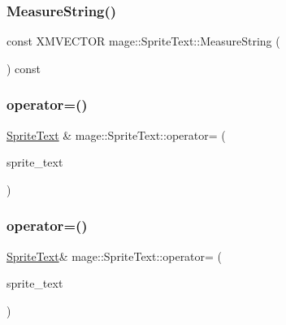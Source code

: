 \subsubsection{\texorpdfstring{Measure\+String()}{MeasureString()}}
{\footnotesize\ttfamily const X\+M\+V\+E\+C\+T\+OR mage\+::\+Sprite\+Text\+::\+Measure\+String (\begin{DoxyParamCaption}{ }\end{DoxyParamCaption}) const}

\hypertarget{classmage_1_1_sprite_text_acc41212e9847babd95afa68aedf2ad42}{}\label{classmage_1_1_sprite_text_acc41212e9847babd95afa68aedf2ad42} 
\subsubsection{\texorpdfstring{operator=()}{operator=()}\hspace{0.1cm}{\footnotesize\ttfamily [1/2]}}
{\footnotesize\ttfamily \hyperlink{classmage_1_1_sprite_text}{Sprite\+Text} \& mage\+::\+Sprite\+Text\+::operator= (\begin{DoxyParamCaption}\item[{const \hyperlink{classmage_1_1_sprite_text}{Sprite\+Text} \&}]{sprite\+\_\+text }\end{DoxyParamCaption})}

\hypertarget{classmage_1_1_sprite_text_a48e9d2fdda8bf2f8847a425444df980c}{}\label{classmage_1_1_sprite_text_a48e9d2fdda8bf2f8847a425444df980c} 
\subsubsection{\texorpdfstring{operator=()}{operator=()}\hspace{0.1cm}{\footnotesize\ttfamily [2/2]}}
{\footnotesize\ttfamily \hyperlink{classmage_1_1_sprite_text}{Sprite\+Text}\& mage\+::\+Sprite\+Text\+::operator= (\begin{DoxyParamCaption}\item[{\hyperlink{classmage_1_1_sprite_text}{Sprite\+Text} \&\&}]{sprite\+\_\+text }\end{DoxyParamCaption})\hspace{0.3cm}{\ttfamily [default]}}


